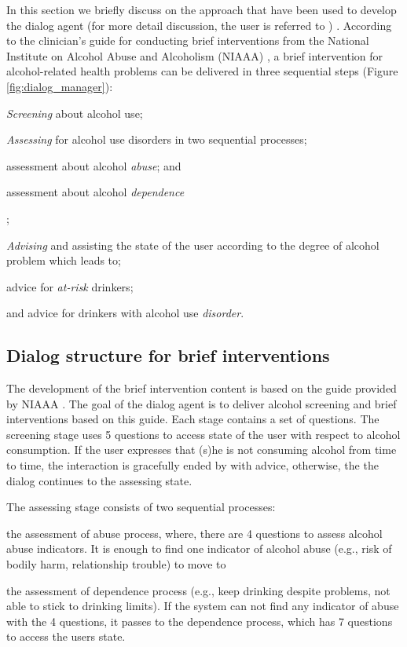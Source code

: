 \documentclass[letterpaper]{article}
\begin{document}
In this section we briefly discuss on the approach that have been used to develop the dialog 
agent (for more detail discussion, the user is referred to \cite{YASCLL14}) . According to the 
clinician's guide for conducting brief interventions from the National Institute on Alcohol Abuse 
and Alcoholism (NIAAA) \cite{national2007helping}, a brief intervention for alcohol-related health 
problems can be delivered in three sequential steps (Figure 
\ref{fig:dialog_manager}): \begin{inparaenum}[1)] \item {\em Screening} about alcohol use; \item 
{\em Assessing} for alcohol use disorders in two sequential processes; \begin{inparaenum}[a)] \item 
assessment about alcohol {\em abuse}; and \item assessment about alcohol {\em 
dependence}\end{inparaenum}; \item {\em Advising} and assisting the state of the user according to 
the degree of alcohol problem which leads to; \begin{inparaenum} \item advice for {\em at-risk} 
drinkers; \item and advice for drinkers with alcohol use {\em disorder}. \end{inparaenum} 
\end{inparaenum}

\subsection*{Dialog structure for brief interventions}

The development of the brief intervention content is based on the guide provided by 
NIAAA \cite{national2006niaaa}. The goal of the dialog agent is to deliver alcohol screening and 
brief interventions based on this guide. Each stage contains a set of questions. The screening stage 
uses 5 questions to access state of the user with respect to alcohol consumption.  If the user 
expresses that (s)he is not consuming alcohol from time to time, the interaction is gracefully ended 
by with advice, otherwise, the the dialog continues to the assessing state.  

The assessing stage consists of two sequential processes: \begin{inparaenum}[1)] \item the 
assessment of abuse process, where, there are 4 questions to assess alcohol abuse indicators.  It is 
enough to find one indicator of alcohol abuse (e.g., risk of bodily harm, relationship trouble) to 
move to \item the assessment of dependence process (e.g., keep drinking despite problems, not able 
to stick to drinking limits). If the system can not find any indicator of abuse with the 4 
questions, it passes to the dependence process, which has  7 questions to access the users state. 
\end{inparaenum}
\end{document}
